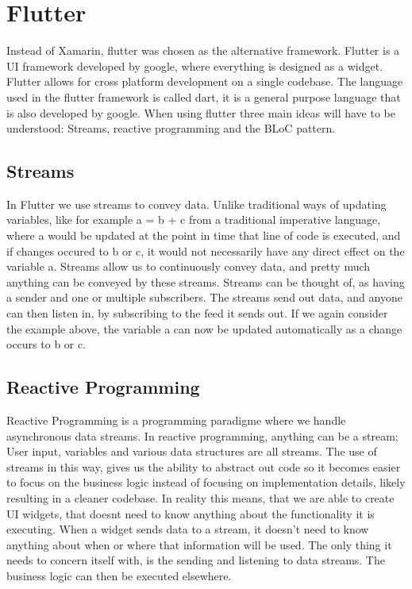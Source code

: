 \section{Flutter}
Instead of Xamarin, flutter was chosen as the alternative framework.
Flutter is a UI framework developed by google, where everything is designed as a widget.
Flutter allows for cross platform development on a single codebase.
The language used in the flutter framework is called dart, it is a general purpose language that is also developed by google.
When using flutter three main ideas will have to be understood:
Streams, reactive programming and the BLoC pattern.

\subsection{Streams}
In Flutter we use streams to convey data.
Unlike traditional ways of updating variables, like for example a = b + c from a traditional imperative language, where a would be updated at the point in time that line of code is executed, and if changes occured to b or c, it would not necessarily have any direct effect on the variable a.
Streams allow us to continuously convey data, and pretty much anything can be conveyed by these streams.
Streams can be thought of, as having a sender and one or multiple subscribers.
The streams send out data, and anyone can then listen in, by subscribing to the feed it sends out.
If we again consider the example above, the variable a can now be updated automatically as a change occurs to b or c.
\subsection{Reactive Programming}
Reactive Programming is a programming paradigme where we handle asynchronous data streams. 
In reactive programming, anything can be a stream; User input, variables and various data structures are all streams. The use of streams in this way, gives us the ability to abstract out code so it becomes easier to focus on the business logic instead of focusing on implementation details, likely resulting in a cleaner codebase.
In reality this means, that we are able to create UI widgets, that doesnt need to know anything about the functionality it is executing. 
When a widget sends data to a stream, it doesn't need to know anything about when or where that information will be used. The only thing it needs to concern itself with, is the sending and listening to data streams. The business logic can then be executed elsewhere. 
